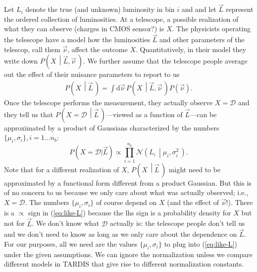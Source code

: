 \documentclass[a4,12pt]{article}
\newcommand{\data}{\ensuremath{\mathcal{D}}}
\newcommand{\expin}{\ensuremath{\lbrace\mu_i, \sigma_i\rbrace}}
\newcommand{\given}[2]{\left(#1\, \middle| #2 \, \right)}
\newcommand{\gaussian}{\ensuremath{\mathcal{N}}}
\newcommand{\Lumi}{\ensuremath{L_i}}
\newcommand{\rmdx}[1]{\mbox{d} #1 \,} %
\newcommand{\vecL}{\ensuremath{\vec{L}}}
\newcommand{\vecnu}{\ensuremath{\vec{\nu}}}
\def \refeq#1{(\ref{eq:#1})}
\newcommand{\tardis}{TARDIS}
\begin{document}
Let \Lumi{} denote the true (and unknown) luminosity in bin $i$ and
and let $\vecL$ represent the ordered collection of luminosities. At a
telescope, a possible realization of what they can observe (charges in
CMOS sensor?) is $X$. The physicists operating the telescope have a
model how the luminosities $\vecL$ and other parameters of the
telescop, call them $\vecnu$, affect the outcome $X$. Quantitatively,
in their model they write down $P \given{X}{\vecL, \vecnu}$.  We
further assume that the telescope people average out the effect of
their nuisance parameters to report to us
\begin{align}
  \label{eq:aver-like}
  P \given{X}{\vecL} = \int \rmdx{\vecnu} P \given{X}{\vecL, \vecnu} P(\vecnu) .
\end{align}
Once the telescope performs the measurement, they actually observe
$X=\data$ and they tell us that $P \given{X=\data}{\vecL}$---viewed as
a function of $\vecL$---can be approximated by a product of Gaussians
characterized by the numbers $\expin, i=1 \dots n_b$:
\begin{equation}
  \label{eq:like-L}
  P(X=\mathcal{D} | \vecL) \propto \prod_{i=1}^{n_b} \gaussian\given{\Lumi}{\mu_i, \sigma_i^2}.
\end{equation}
Note that for a different realization of $X$, $ P \given{X}{\vecL}$
might need to be approximated by a functional form different from a
product Gaussian. But this is of no concern to us because we only care
about what was actually observed; i.e., $X=\data$. The numbers
$\expin$ of course depend on $X$ (and the effect of $\vecnu$!). There
is a $\propto$ sign in \refeq{like-L} because the lhs sign is a
probability density for $X$ but not for $\vecL$. We don't know what
$\data$ actually is: the telescope people don't tell us and we don't
need to know as long as we only care about the dependence on
$\vecL$. For our purposes, all we need are the values $\expin$ to plug
into \refeq{like-L} under the given assumptions. We can ignore the
normalization unless we compare different models in \tardis{}
that give rise to different normalization constants.
\end{document}
